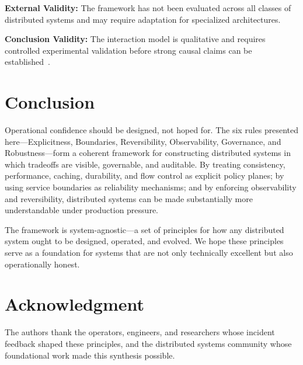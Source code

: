 \documentclass[conference]{IEEEtran}
\begin{document}
\textbf{External Validity:}
The framework has not been evaluated across all classes of distributed systems and may require adaptation for specialized architectures.

\textbf{Conclusion Validity:}
The interaction model is qualitative and requires controlled experimental validation before strong causal claims can be established~\cite{gherghe2025framework}.

\section{Conclusion}

Operational confidence should be designed, not hoped for. The six rules presented here---Explicitness, Boundaries, Reversibility, Observability, Governance, and Robustness---form a coherent framework for constructing distributed systems in which tradeoffs are visible, governable, and auditable. By treating consistency, performance, caching, durability, and flow control as explicit policy planes; by using service boundaries as reliability mechanisms; and by enforcing observability and reversibility, distributed systems can be made substantially more understandable under production pressure.

The framework is system-agnostic---a set of principles for how any distributed system ought to be designed, operated, and evolved. We hope these principles serve as a foundation for systems that are not only technically excellent but also operationally honest.

\section*{Acknowledgment}

The authors thank the operators, engineers, and researchers whose incident feedback shaped these principles, and the distributed systems community whose foundational work made this synthesis possible.
\end{document}
